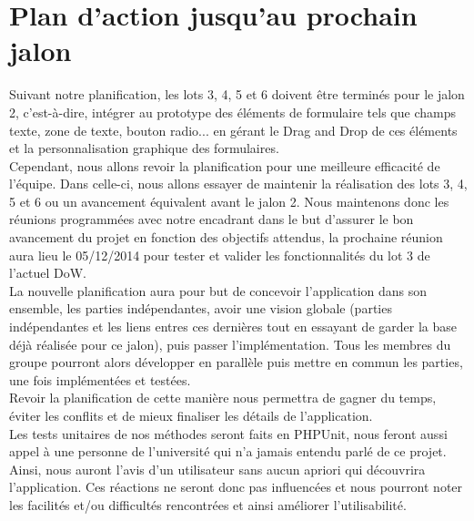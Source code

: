 \documentclass{sigplanconf}
\begin{document}
\section{Plan d'action jusqu'au prochain jalon}
Suivant notre planification, les lots 3, 4, 5 et 6 doivent \^etre termin\'es pour le jalon 2, c'est-\`a-dire, int\'egrer au prototype des \'el\'ements de formulaire tels que champs texte, zone de texte, bouton radio... en g\'erant le Drag and Drop de ces \'el\'ements et la personnalisation graphique des formulaires.\\
Cependant, nous allons revoir la planification pour une meilleure efficacit\'e de l'\'equipe. Dans celle-ci, nous allons essayer de maintenir la r\'ealisation des lots 3, 4, 5 et 6 ou un avancement \'equivalent avant le jalon 2. Nous maintenons donc les r\'eunions programm\'ees avec notre encadrant dans le but d'assurer le bon avancement du projet en fonction des objectifs attendus, la prochaine r\'eunion aura lieu le 05/12/2014 pour tester et valider les fonctionnalités du lot 3 de l'actuel DoW.\\
La nouvelle planification aura pour but de concevoir l'application dans son ensemble, les parties ind\'ependantes, avoir une vision globale (parties ind\'ependantes et les liens entres ces derni\`eres tout en essayant de garder la base d\'ej\`a réalis\'ee pour ce jalon), puis passer l'impl\'ementation. Tous les membres du groupe pourront alors d\'evelopper en parall\`ele puis mettre en commun les parties, une fois impl\'ement\'ees et test\'ees.\\
Revoir la planification de cette mani\`ere nous permettra de gagner du temps, \'eviter les conflits et de mieux finaliser les d\'etails de l'application.\\
Les tests unitaires de nos m\'ethodes seront faits en PHPUnit, nous feront aussi appel \`a une personne de l'universit\'e qui n'a jamais entendu parl\'e de ce projet. Ainsi, nous auront l'avis d'un utilisateur sans aucun apriori qui d\'ecouvrira l'application. Ces r\'eactions ne seront donc pas influenc\'ees et nous pourront noter les facilit\'es et/ou difficult\'es rencontr\'ees et ainsi am\'eliorer l'utilisabilit\'e.\\


\appendix










\end{document}
